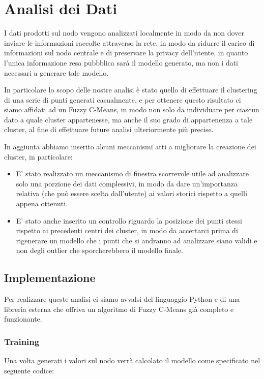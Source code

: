 \chapter{Analisi dei Dati}
I dati prodotti sul nodo vengono analizzati localmente in modo da non dover inviare le informazioni raccolte attraverso la rete, in modo da ridurre il carico di informazioni sul nodo centrale
e di preservare la privacy dell'utente, in quanto l'unica informazione resa pubbblica sarà il modello generato, ma non i dati necessari a generare tale modello.

In particolare lo scopo delle nostre analisi è stato quello di effettuare il clustering di una serie di punti generati casualmente, e per ottenere questo risultato ci siamo affidati ad un Fuzzy C-Means, in modo
non solo da individuare per ciascun dato a quale cluster appartenesse, ma anche il suo grado di appartenenza a tale cluster, al fine di effettuare future analisi ulteriormente più precise.

In aggiunta abbiamo inserito alcuni meccanismi atti a migliorare la creazione dei cluster, in particolare:
\begin{itemize}
  \item E' stato realizzato un meccanismo di finestra scorrevole utile ad analizzare solo una porzione dei dati complessivi, in modo da dare un'importanza relativa (che può essere scelta dall'utente) ai valori storici rispetto a quelli appena ottenuti.
  \item E' stato anche inserito un controllo riguardo la posizione dei punti stessi rispetto ai precedenti centri dei cluster, in modo da accertarci prima di rigenerare un modello che i punti che si andranno ad analizzare siano validi e non degli outlier che sporcherebbero il modello finale.
\end{itemize}

\section{Implementazione}

Per realizzare queste analisi ci siamo avvalsi del linguaggio Python e di una libreria esterna che offriva un algoritmo di Fuzzy C-Means già completo e funzionante.

\subsection{Training}

Una volta generati i valori sul nodo verrà calcolato il modello come specificato nel seguente codice:


